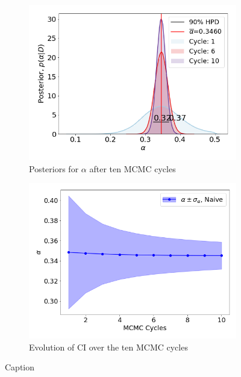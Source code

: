 \documentclass[11pt,a4paper]{article}
\begin{document}
\begin{figure}[H]
    \centering
    \begin{subfigure}{.46\textwidth}
          \centering
          \includegraphics[width=1\textwidth]{figures/naive_posterior.png}
          \caption{Posteriors for $\alpha$ after ten MCMC cycles} 
          \label{fig:naive_posterior}
    \end{subfigure}%
    \begin{subfigure}{.46\textwidth}
          \centering
          \includegraphics[width=1\textwidth]{figures/naive_ci.png}
          \caption{Evolution of CI over the ten MCMC cycles}
    \label{fig:naive_evolution}
    \end{subfigure}
    \caption{Caption}
    \label{fig:naive}
\end{figure}
\end{document}

